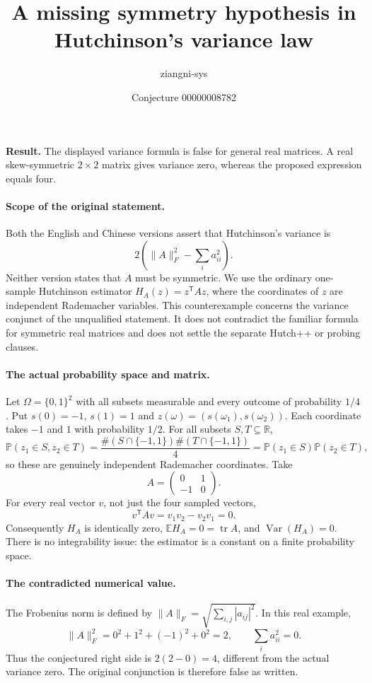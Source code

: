\documentclass[11pt]{article}
\title{A missing symmetry hypothesis in Hutchinson's variance law}
\author{ziangni-sys}
\date{Conjecture 00000008782}
\begin{document}
\raggedright
\maketitle
\noindent\textbf{Result.} The displayed variance formula is false for general real matrices. A real skew-symmetric $2\times2$ matrix gives variance zero, whereas the proposed expression equals four.

\paragraph{Scope of the original statement.}
Both the English and Chinese versions assert that Hutchinson's variance is
\[
2\left(\|A\|_F^2-\sum_i a_{ii}^2\right).
\]
Neither version states that $A$ must be symmetric.
We use the ordinary one-sample Hutchinson estimator $H_A(z)=z^{\mathsf T}Az$, where the coordinates of $z$ are independent Rademacher variables.
This counterexample concerns the variance conjunct of the unqualified statement. It does not contradict the familiar formula for symmetric real matrices and does not settle the separate Hutch++ or probing clauses.

\paragraph{The actual probability space and matrix.}
Let $\Omega=\{0,1\}^2$ with all subsets measurable and every outcome of probability $1/4$. Put $s(0)=-1$, $s(1)=1$ and $z(\omega)=(s(\omega_1),s(\omega_2))$. Each coordinate takes $-1$ and $1$ with probability $1/2$. For all subsets $S,T\subseteq\mathbb R$,
\[
\mathbb P(z_1\in S,z_2\in T)
=\frac{\#(S\cap\{-1,1\})\#(T\cap\{-1,1\})}{4}
=\mathbb P(z_1\in S)\mathbb P(z_2\in T),
\]
so these are genuinely independent Rademacher coordinates. Take
\[
A=\begin{pmatrix}0&1\\-1&0\end{pmatrix}.
\]
For every real vector $v$, not just the four sampled vectors,
\[
v^{\mathsf T}Av=v_1v_2-v_2v_1=0.
\]
Consequently $H_A$ is identically zero, $\mathbb E H_A=0=\operatorname{tr}A$, and $\operatorname{Var}(H_A)=0$. There is no integrability issue: the estimator is a constant on a finite probability space.

\newpage
\paragraph{The contradicted numerical value.}
The Frobenius norm is defined by $\|A\|_F=\sqrt{\sum_{i,j}|a_{ij}|^2}$. In this real example,
\[
\|A\|_F^2=0^2+1^2+(-1)^2+0^2=2,
\qquad \sum_i a_{ii}^2=0.
\]
Thus the conjectured right side is $2(2-0)=4$, different from the actual variance zero. The original conjunction is therefore false as written.
\end{document}
